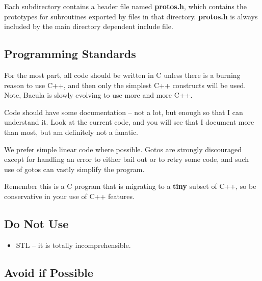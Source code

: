 Each subdirectory contains a header file named {\bf protos.h}, which contains
the prototypes for subroutines exported by files in that directory. {\bf
protos.h} is always included by the main directory dependent include file.

\subsection{Programming Standards}

For the most part, all code should be written in C unless there is a burning
reason to use C++, and then only the simplest C++ constructs will be used.
Note, Bacula is slowly evolving to use more and more C++.

Code should have some documentation -- not a lot, but enough so that I can
understand it. Look at the current code, and you will see that I document more
than most, but am definitely not a fanatic.

We prefer simple linear code where possible. Gotos are strongly discouraged
except for handling an error to either bail out or to retry some code, and
such use of gotos can vastly simplify the program.

Remember this is a C program that is migrating to a {\bf tiny} subset of C++,
so be conservative in your use of C++ features.

\subsection{Do Not Use}

\begin{itemize}
 \item STL -- it is totally incomprehensible.
\end{itemize}

\subsection{Avoid if Possible}

